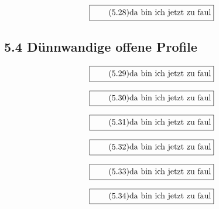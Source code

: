 \documentclass[11pt]{article}
\newcommand{\1}{ {\mathds{1}} }
\begin{document}
    \begin{equation}
      \boxed{
        \tag{5.28}
        \begin{split}
          \text{da bin ich jetzt zu faul}
        \end{split}
      }
    \end{equation}

    \subsection*{5.4 Dünnwandige offene Profile}

    \begin{equation}
      \boxed{
        \tag{5.29}
        \begin{split}
          \text{da bin ich jetzt zu faul}
        \end{split}
      }
    \end{equation}

    \begin{equation}
      \boxed{
        \tag{5.30}
        \begin{split}
          \text{da bin ich jetzt zu faul}
        \end{split}
      }
    \end{equation}

    \begin{equation}
      \boxed{
        \tag{5.31}
        \begin{split}
          \text{da bin ich jetzt zu faul}
        \end{split}
      }
    \end{equation}

    \begin{equation}
      \boxed{
        \tag{5.32}
        \begin{split}
          \text{da bin ich jetzt zu faul}
        \end{split}
      }
    \end{equation}

    \begin{equation}
      \boxed{
        \tag{5.33}
        \begin{split}
          \text{da bin ich jetzt zu faul}
        \end{split}
      }
    \end{equation}

    \begin{equation}
      \boxed{
        \tag{5.34}
        \begin{split}
          \text{da bin ich jetzt zu faul}
        \end{split}
      }
    \end{equation}
    
\end{document}
